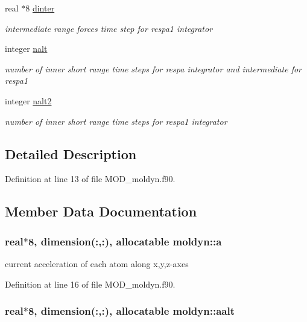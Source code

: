 \begin{DoxyCompactItemize}
real $\ast$8 \hyperlink{classmoldyn_a1cd6fdf3c020c12a8195c47b37fa62d3}{dinter}
\begin{DoxyCompactList}\small\item\em intermediate range forces time step for respa1 integrator \end{DoxyCompactList}\item 
integer \hyperlink{classmoldyn_aab13fe54485a53ad7bb8219186aff2e8}{nalt}
\begin{DoxyCompactList}\small\item\em number of inner short range time steps for respa integrator and intermediate for respa1 \end{DoxyCompactList}\item 
integer \hyperlink{classmoldyn_ad6964022cb98874d3ce9b7db35f12ad4}{nalt2}
\begin{DoxyCompactList}\small\item\em number of inner short range time steps for respa1 integrator \end{DoxyCompactList}\end{DoxyCompactItemize}


\subsection{Detailed Description}


Definition at line 13 of file M\-O\-D\-\_\-moldyn.\-f90.



\subsection{Member Data Documentation}
\hypertarget{classmoldyn_ae8b981427504a1afaa1a90aeb47d29d3}{
\subsubsection[{a}]{\setlength{\rightskip}{0pt plus 5cm}real$\ast$8, dimension(\-:,\-:), allocatable moldyn\-::a}}\label{classmoldyn_ae8b981427504a1afaa1a90aeb47d29d3}


current acceleration of each atom along x,y,z-\/axes 



Definition at line 16 of file M\-O\-D\-\_\-moldyn.\-f90.

\hypertarget{classmoldyn_ac63436eccf763211939d5388e0803f24}{
\subsubsection[{aalt}]{\setlength{\rightskip}{0pt plus 5cm}real$\ast$8, dimension(\-:,\-:), allocatable moldyn\-::aalt}}\label{classmoldyn_ac63436eccf763211939d5388e0803f24}


